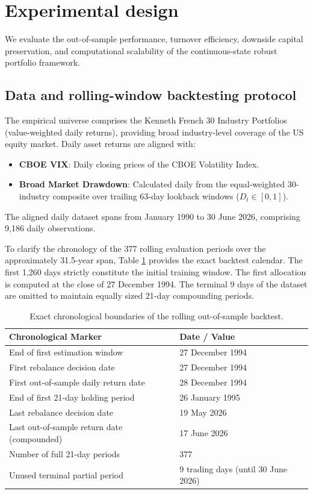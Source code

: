 \documentclass[smallextended]{svjour3}
\begin{document}
\section{Experimental design}
We evaluate the out-of-sample performance, turnover efficiency, downside capital preservation, and computational scalability of the continuous-state robust portfolio framework.

\subsection{Data and rolling-window backtesting protocol}
The empirical universe comprises the Kenneth French 30 Industry Portfolios \cite{french2026data} (value-weighted daily returns), providing broad industry-level coverage of the US equity market. Daily asset returns are aligned with:
\begin{itemize}
    \item \textbf{CBOE VIX}: Daily closing prices of the CBOE Volatility Index.
    \item \textbf{Broad Market Drawdown}: Calculated daily from the equal-weighted 30-industry composite over trailing 63-day lookback windows ($D_t \in [0, 1]$).
\end{itemize}
The aligned daily dataset spans from January 1990 to 30 June 2026, comprising 9,186 daily observations.

To clarify the chronology of the 377 rolling evaluation periods over the approximately 31.5-year span, Table \ref{tab:timeline} provides the exact backtest calendar. The first 1,260 days strictly constitute the initial training window. The first allocation is computed at the close of 27 December 1994. The terminal 9 days of the dataset are omitted to maintain equally sized 21-day compounding periods.

\begin{table}[htbp]
\centering
\caption{Exact chronological boundaries of the rolling out-of-sample backtest.}
\label{tab:timeline}
\begin{tabular}{ll}
\toprule
\textbf{Chronological Marker} & \textbf{Date / Value} \\
\midrule
End of first estimation window & 27 December 1994 \\
First rebalance decision date & 27 December 1994 \\
First out-of-sample daily return date & 28 December 1994 \\
End of first 21-day holding period & 26 January 1995 \\
Last rebalance decision date & 19 May 2026 \\
Last out-of-sample return date (compounded) & 17 June 2026 \\
Number of full 21-day periods & 377 \\
Unused terminal partial period & 9 trading days (until 30 June 2026) \\
\bottomrule
\end{tabular}
\end{table}
\end{document}
